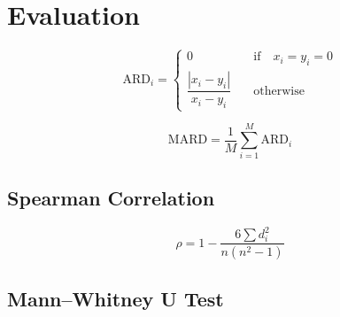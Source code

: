 \section{Evaluation}
\[
    \mathrm{ARD}_i = \begin{cases}
        0 &\quad\text{if}\quad x_i = y_i = 0\\
        \dfrac{\left| x_i-y_i \right| }{x_i-y_i} &\quad\text{otherwise}\quad
    \end{cases}
\]

\[
    \mathrm{MARD} = \frac{1}{M} \sum^{M}_{i = 1}\mathrm{ARD}_i
\]
\subsection{Spearman Correlation}
\[
    \rho = 1 - \dfrac{6 \sum{d^2_i}}{n(n^2-1)}
\]
\subsection{Mann–Whitney U Test}
